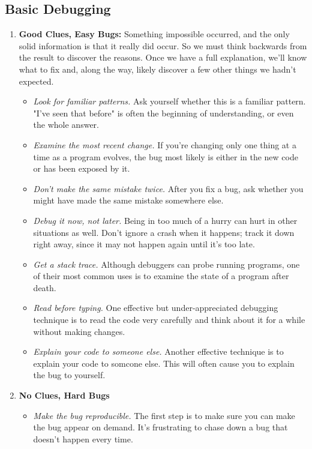 \documentclass[draftclsnofoot,journal,onecolumn,12pt]{IEEEtran}
\begin{document}
\subsection{Basic Debugging}
\begin{enumerate}
  \item \textbf{Good Clues, Easy Bugs:} Something impossible occurred, and the only solid information is that it really did occur.
So we must think backwards from the result to discover the reasons. Once we have a full explanation, we'll know what to fix and, along the way, likely discover a few other things we hadn't expected.
\begin{itemize}
  \item \textit{Look for familiar patterns.} Ask yourself whether this is a familiar pattern. "I've seen that before" is often the beginning of understanding, or even the whole answer.
  \item \textit{Examine the most recent change.} If you're changing only one thing at a time as a program evolves, the bug most likely is either in the new code or has been exposed by it.
  \item \textit{Don't make the same mistake twice.} After you fix a bug, ask whether you might have made the same mistake somewhere else.
  \item \textit{Debug it now, not later.} Being in too much of a hurry can hurt in other situations as well. Don't ignore a crash when it happens; track it down right away, since it may not happen again until it's too late.
  \item \textit{Get a stack trace.} Although debuggers can probe running programs, one of their most common uses is to examine the state of a program after death.
  \item \textit{Read before typing.} One effective but under-appreciated debugging technique is to read the code very carefully and think about it for a while without making changes.
  \item \textit{Explain your code to someone else.} Another effective technique is to explain your code to somcone else. This will often cause you to explain the bug to yourself.
\end{itemize}
  \item \textbf{No Clues, Hard Bugs}
  \begin{itemize}
    \item \textit{Make the bug reproducible.} The first step is to make sure you can make the bug appear on demand. It's frustrating to chase down a bug that doesn't happen every time.

\end{itemize}
\end{enumerate}
\end{document}
